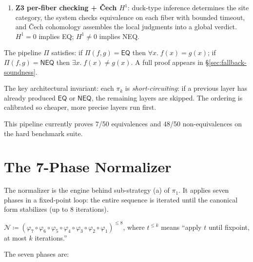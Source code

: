\begin{enumerate}
  \item[\textbf{$\pi_3$}:] \textbf{Z3 per-fiber checking +
    \v{C}ech $H^1$}: duck-type inference determines the site
    category, the system checks equivalence on each fiber with
    bounded timeout, and \v{C}ech cohomology assembles the local
    judgments into a global verdict.  $H^1 = 0$ implies EQ;
    $H^1 \neq 0$ implies NEQ.
\end{enumerate}

\begin{theorem}
\label{thm:pipeline-soundness-informal}
The pipeline $\Pi$ satisfies: if $\Pi(f,g) = \mathsf{EQ}$
then $\forall x.\; f(x) = g(x)$; if $\Pi(f,g) = \mathsf{NEQ}$
then $\exists x.\; f(x) \neq g(x)$.  A full proof appears in
\S\ref{sec:fallback-soundness}.
\end{theorem}

The key architectural invariant: each $\pi_k$ is
\emph{short-circuiting}: if a previous layer has already produced
$\mathsf{EQ}$ or $\mathsf{NEQ}$, the remaining layers are skipped.
The ordering is calibrated so cheaper, more precise layers run first.

This pipeline currently proves 7/50 equivalences and 48/50
non-equivalences on the hard benchmark suite.


\section{The 7-Phase Normalizer}
\label{sec:normalizer-formal}

The normalizer is the engine behind sub-strategy (a) of $\pi_1$.
It applies seven phases in a fixed-point loop: the entire sequence
is iterated until the canonical form stabilizes (up to 8 iterations).

\begin{definition}[Normalizer]
\label{def:normalizer}
$\mathcal{N} \coloneqq (\varphi_7 \circ \varphi_6 \circ \varphi_5
\circ \varphi_4 \circ \varphi_3 \circ \varphi_2 \circ \varphi_1)^{\leq 8}$,
where $t^{\leq k}$ means ``apply $t$ until fixpoint, at most $k$
iterations.''
\end{definition}

The seven phases are:

